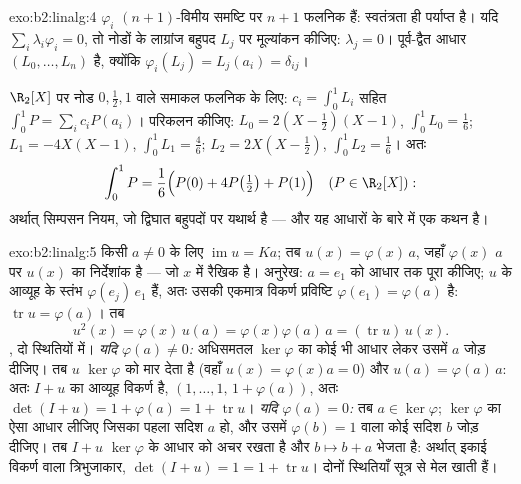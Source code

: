 \begin{solution}{exo:b2:linalg:4}
$\varphi_i$ $(n+1)$-विमीय समष्टि पर $n + 1$ फलनिक हैं: स्वतंत्रता ही पर्याप्त है।
यदि $\sum_i \lambda_i \varphi_i = 0$, तो नोडों के लाग्रांज बहुपद $L_j$ पर मूल्यांकन कीजिए: $\lambda_j = 0$।
पूर्व-द्वैत आधार $(L_0, \dots, L_n)$ है, क्योंकि $\varphi_i(L_j) =
L_j(a_i) = \delta_{ij}$।

$\R_2[X]$ पर नोड $0, \frac12, 1$ वाले समाकल फलनिक के लिए: $c_i = \int_0^1 L_i$ सहित $\int_0^1 P = \sum_i c_i P(a_i)$। परिकलन कीजिए:
$L_0 = 2(X - \tfrac12)(X - 1)$, $\int_0^1 L_0 = \frac16$; $L_1 =
-4X(X-1)$, $\int_0^1 L_1 = \frac46$; $L_2 = 2X(X - \tfrac12)$, $\int_0^1 L_2 = \frac16$। अतः
\[
\int_0^1 P = \frac{1}{6}\Bigl(P(0) + 4P\bigl(\tfrac12\bigr) +
P(1)\Bigr)
\quad (P \in \R_2[X]) :
\]
अर्थात् सिम्पसन नियम, जो द्विघात बहुपदों पर यथार्थ है --- और यह 
आधारों के बारे में एक कथन है।
\end{solution}

\begin{solution}{exo:b2:linalg:5}
किसी $a \neq 0$ के लिए $\operatorname{im} u = Ka$; तब $u(x) =
\varphi(x)\,a$, जहाँ $\varphi(x)$ $a$ पर $u(x)$ का निर्देशांक है ---
जो $x$ में रैखिक है। अनुरेख: $a = e_1$ को आधार तक पूरा कीजिए; $u$ के आव्यूह
के स्तंभ $\varphi(e_j)\,e_1$ हैं, अतः उसकी एकमात्र विकर्ण प्रविष्टि $\varphi(e_1) = \varphi(a)$ है: $\operatorname{tr} u =
\varphi(a)$। तब
\[
u^2(x) = \varphi(x)\, u(a) = \varphi(x)\varphi(a)\, a
= (\operatorname{tr} u)\, u(x).
\]
, दो स्थितियों में। \emph{यदि $\varphi(a) \neq 0$:} अधिसमतल $\ker\varphi$ का कोई भी
आधार लेकर उसमें $a$ जोड़ दीजिए। तब $u$ $\ker\varphi$ को मार देता है (वहाँ
$u(x) = \varphi(x)a = 0$) और $u(a) =
\varphi(a)\,a$: अतः $I + u$ का आव्यूह विकर्ण है, $(1, \dots, 1,\,
1 + \varphi(a))$, अतः $\det(I + u) = 1 + \varphi(a) = 1 +
\operatorname{tr} u$।
\emph{यदि $\varphi(a) = 0$:} तब $a \in
\ker\varphi$; $\ker\varphi$ का ऐसा आधार लीजिए जिसका पहला सदिश $a$
हो, और उसमें $\varphi(b) = 1$ वाला कोई सदिश $b$ जोड़ दीजिए। तब $I + u$ $\ker\varphi$ के आधार
को अचर रखता है और $b \mapsto b + a$ भेजता है: अर्थात् इकाई विकर्ण वाला त्रिभुजाकार,
$\det(I + u) = 1 = 1 +
\operatorname{tr} u$। दोनों स्थितियाँ सूत्र से मेल खाती हैं।
\end{solution}

